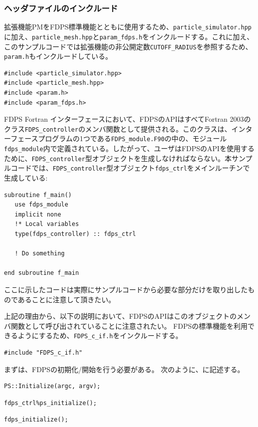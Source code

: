 \subsubsection{ヘッダファイルのインクルード}
拡張機能PMをFDPS標準機能とともに使用するため、\texttt{particle\_simulator.hpp}に加え、\texttt{particle\_mesh.hpp}と\texttt{param\_fdps.h}をインクルードする。これに加え、このサンプルコードでは拡張機能の非公開定数\texttt{CUTOFF\_RADIUS}を参照するため、\texttt{param.h}もインクルードしている。
\begin{lstlisting}[caption=Include FDPS]
#include <particle_simulator.hpp>
#include <particle_mesh.hpp>
#include <param.h>
#include <param_fdps.h>
\end{lstlisting}
\endifCpp
\ifFtn %
FDPS Fortran インターフェースにおいて、FDPSのAPIはすべてFortran 2003のクラス\texttt{FDPS\_controller}のメンバ関数として提供される。このクラスは、インターフェースプログラムの1つである\texttt{FDPS\_module.F90}の中の、モジュール\texttt{fdps\_module}内で定義されている。したがって、ユーザはFDPSのAPIを使用するために、\texttt{FDPS\_controller}型オブジェクトを生成しなければならない。本サンプルコードでは、\texttt{FDPS\_controller}型オブジェクト\texttt{fdps\_ctrl}をメインルーチンで生成している:
\begin{lstlisting}[caption=\texttt{fdps\_controller}型オブジェクトの生成]
subroutine f_main()
   use fdps_module
   implicit none
   !* Local variables
   type(fdps_controller) :: fdps_ctrl
    
   ! Do something
   
end subroutine f_main    
\end{lstlisting}
ここに示したコードは実際にサンプルコードから必要な部分だけを取り出したものであることに注意して頂きたい。

上記の理由から、以下の説明において、FDPSのAPIはこのオブジェクトのメンバ関数として呼び出されていることに注意されたい。
\endifFtn
\ifC %
FDPSの標準機能を利用できるようにするため、\texttt{FDPS\_c\_if.h}をインクルードする。
\begin{lstlisting}[caption=ヘッダーファイル\texttt{FDPS\_c\_if.h}のインクルード]
#include "FDPS_c_if.h"
\end{lstlisting}
\endifC


まずは、FDPSの初期化/開始を行う必要がある。
次のように、\mainFunc に記述する。

\ifCpp %
\begin{lstlisting}[caption=FDPSの開始]
PS::Initialize(argc, argv);
\end{lstlisting}
\endifCpp
\ifFtn %
\begin{lstlisting}[caption=FDPSの開始]
fdps_ctrl%ps_initialize();
\end{lstlisting}
\endifFtn
\ifC %
\begin{lstlisting}[caption=FDPSの開始]
fdps_initialize();
\end{lstlisting}
\endifC


